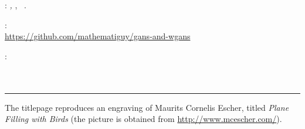 \thispagestyle{empty}

\hfill

\vfill

\noindent\myName:
\textit{\myTitle,} \mySubTitle,
\textcopyright\ \myTime.

\medskip
{}: \\
\url{https://github.com/mathematiguy/gans-and-wgans}

\medskip
{}: \\
 \\
 \\

\vspace{1cm}
\hrule
\bigskip

\noindent The titlepage reproduces an engraving of Maurits Cornelis Escher, titled \emph{Plane Filling with Birds} (the picture is obtained from \url{http://www.mcescher.com/}).